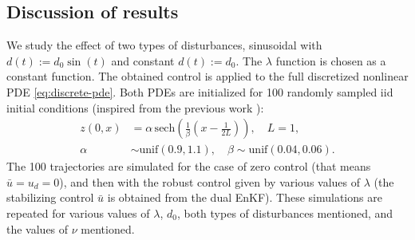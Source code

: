 \documentclass[letterpaper, 10 pt, conference]{ieeeconf}  %
\begin{document}

\subsection{Discussion of results}
We study the effect of two types of disturbances, sinusoidal with $d(t) := d_0\sin(t)$ and constant $d(t) := d_0$. The $\lambda$ function is chosen as a constant function. The obtained control is applied to the full discretized nonlinear PDE \eqref{eq:discrete-pde}. %
Both PDEs are initialized for 100 randomly sampled iid initial conditions (inspired from the previous work \cite{zhang-2024}): 
\begin{align*}
    z(0,x) &= \alpha \, \mathrm{sech}\left(\frac{1}{\beta}\left({x} - \frac{1}{2L}\right)\right), \quad L=1, \; \\ 
    \alpha &\sim \mathrm{unif}(0.9, 1.1), \quad \beta \sim \mathrm{unif}(0.04, 0.06).
\end{align*}
The 100 trajectories are simulated for the case of zero control (that means $\bar{u} = u_d = 0$), and then with the robust control given by various values of $\lambda$ (the stabilizing control $\bar{u}$ is obtained from the dual EnKF). These simulations are repeated for various values of $\lambda$, $d_0$, both types of disturbances mentioned, and the values of $\nu$ mentioned. 

\end{document}
